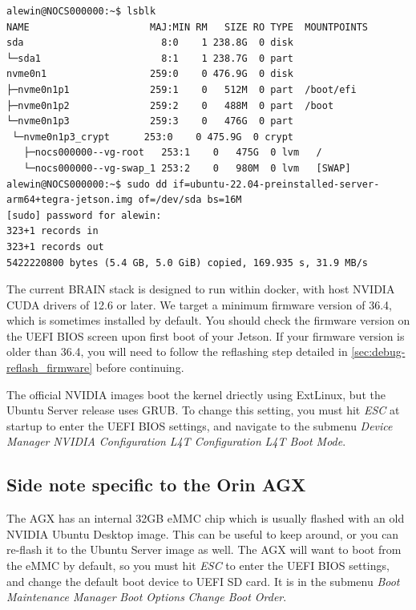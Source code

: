 \documentclass[11pt]{article}
\begin{document}
\lstset{style=console}
\begin{lstlisting}
alewin@NOCS000000:~$ lsblk
NAME                     MAJ:MIN RM   SIZE RO TYPE  MOUNTPOINTS
sda                        8:0    1 238.8G  0 disk
└─sda1                     8:1    1 238.7G  0 part
nvme0n1                  259:0    0 476.9G  0 disk
├─nvme0n1p1              259:1    0   512M  0 part  /boot/efi
├─nvme0n1p2              259:2    0   488M  0 part  /boot
└─nvme0n1p3              259:3    0   476G  0 part
 └─nvme0n1p3_crypt      253:0    0 475.9G  0 crypt
   ├─nocs000000--vg-root   253:1    0   475G  0 lvm   /
   └─nocs000000--vg-swap_1 253:2    0   980M  0 lvm   [SWAP]
alewin@NOCS000000:~$ sudo dd if=ubuntu-22.04-preinstalled-server-arm64+tegra-jetson.img of=/dev/sda bs=16M
[sudo] password for alewin:
323+1 records in
323+1 records out
5422220800 bytes (5.4 GB, 5.0 GiB) copied, 169.935 s, 31.9 MB/s
\end{lstlisting}

The current BRAIN stack is designed to run within docker, with host NVIDIA CUDA drivers of 12.6 or later. We target a minimum firmware version of 36.4, which is sometimes installed by default. You should check the firmware version on the UEFI BIOS screen upon first boot of your Jetson. If your firmware version is older than 36.4, you will need to follow the reflashing step detailed in \autoref{sec:debug-reflash_firmware} before continuing.

The official NVIDIA images boot the kernel driectly using ExtLinux, but the Ubuntu Server release uses GRUB. To change this setting, you must hit \textit{ESC} at startup to enter the UEFI BIOS settings, and navigate to the submenu \textit{Device Manager} \Rightarrow \textit{NVIDIA Configuration} \Rightarrow \textit{L4T Configuration} \Rightarrow \textit{L4T Boot Mode}.

\subsection*{Side note specific to the Orin AGX}

The AGX has an internal 32GB eMMC chip which is usually flashed with an old NVIDIA Ubuntu Desktop image. This can be useful to keep around, or you can re-flash it to the Ubuntu Server image as well. The AGX will want to boot from the eMMC by default, so you must hit \textit{ESC} to enter the UEFI BIOS settings, and change the default boot device to UEFI SD card. It is in the submenu \textit{Boot Maintenance Manager} \Rightarrow \textit{Boot Options} \Rightarrow \textit{Change Boot Order}.
\end{document}
